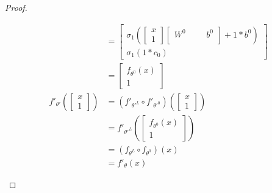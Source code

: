 \documentclass[a4paper]{article}
\theoremstyle{definition}
\begin{document}
\begin{proof}
\begin{enumerate}
\begin{align}
            &=\begin{bmatrix}
                \sigma_1(\begin{bmatrix}     x\\     1 \end{bmatrix}\begin{bmatrix}
                    W^0 & & & b^0\\
                \end{bmatrix} + 1*b^0)\\
                \sigma_1(1*c_0)
            \end{bmatrix}\\
            &=\begin{bmatrix}
                f_{\theta^0}(x)\\
                1
            \end{bmatrix}\\
            f'_{\theta'}(\begin{bmatrix}     x\\     1 \end{bmatrix}) &=(f'_{\theta'^L} \circ f'_{\theta'^0}) (\begin{bmatrix}     x\\     1 \end{bmatrix})\\
            &= f'_{\theta'^L}(\begin{bmatrix}
                f_{\theta^0}(x)\\
                1
            \end{bmatrix})\\
            &= (f_{\theta^L} \circ f_{\theta^0})(x)\\
            &= f'_{\theta}(x)
        \end{align}
    \end{enumerate}
\end{proof}




\end{document}

